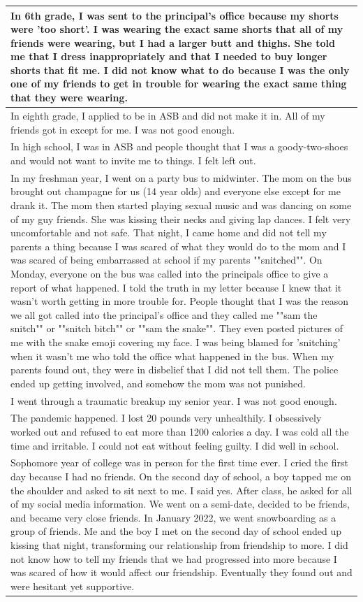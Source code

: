 \documentclass[
  .7em,
  letterpaper,
  DIV=11,
  numbers=noendperiod]{scrartcl}
\begin{document}
\begin{table}
\begin{tabular}{l}
\hline
In 6th grade, I was sent to the principal's office because my shorts were 'too short'. I was wearing the exact same shorts that all of my friends were wearing, but I had a larger butt and thighs. She told me that I dress inappropriately and that I needed to buy longer shorts that fit me. I did not know what to do because I was the only one of my friends to get in trouble for wearing the exact same thing that they were wearing.\\
\hline
In eighth grade, I applied to be in ASB and did not make it in. All of my friends got in except for me. I was not good enough.\\
\hline
In high school, I was in ASB and people thought that I was a goody-two-shoes and would not want to invite me to things. I felt left out.\\
\hline
In my freshman year, I went on a party bus to midwinter. The mom on the bus brought out champagne for us (14 year olds) and everyone else except for me drank it. The mom then started playing sexual music and was dancing on some of my guy friends. She was kissing their necks and giving lap dances. I felt very uncomfortable and not safe. That night, I came home and did not tell my parents a thing because I was scared of what they would do to the mom and I was scared of being embarrassed at school if my parents ""snitched"". On Monday, everyone on the bus was called into the principals office to give a report of what happened. I told the truth in my letter because I knew that it wasn't worth getting in more trouble for. People thought that I was the reason we all got called into the principal's office and they called me ""sam the snitch"" or ""snitch bitch"" or ""sam the snake"". They even posted pictures of me with the snake emoji covering my face. I was being blamed for 'snitching' when it wasn't me who told the office what happened in the bus. When my parents found out, they were in disbelief that I did not tell them. The police ended up getting involved, and somehow the mom was not punished.\\
\hline
I went through a traumatic breakup my senior year. I was not good enough.\\
\hline
The pandemic happened. I lost 20 pounds very unhealthily. I obsessively worked out and refused to eat more than 1200 calories a day. I was cold all the time and irritable. I could not eat without feeling guilty. I did well in school.\\
\hline
Sophomore year of college was in person for the first time ever. I cried the first day because I had no friends. On the second day of school, a boy tapped me on the shoulder and asked to sit next to me. I said yes. After class, he asked for all of my social media information. We went on a semi-date, decided to be friends, and became very close friends. In January 2022, we went snowboarding as a group of friends. Me and the boy I met on the second day of school ended up kissing that night, transforming our relationship from friendship to more. I did not know how to tell my friends that we had progressed into more because I was scared of how it would affect our friendship. Eventually they found out and were hesitant yet supportive.\\

\end{tabular}
\end{table}
\end{document}
